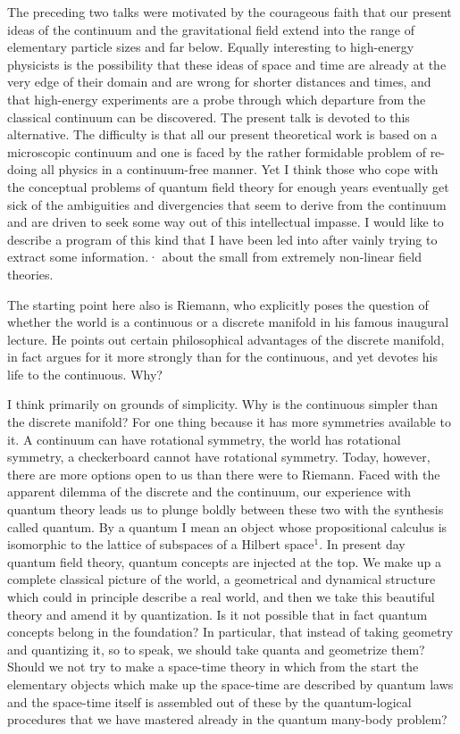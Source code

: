 The preceding two talks were motivated by the courageous faith that our present
ideas of the continuum and the gravitational field extend into the range of
elementary particle sizes and far below. Equally interesting to high-energy
physicists is the possibility that these ideas of space and time are already at
the very edge of their domain and are wrong for shorter distances and times, and
that high-energy experiments are a probe through which departure from the
classical continuum can be discovered. The present talk is devoted to this
alternative. The difficulty is that all our present theoretical work is based on
a microscopic continuum and one is faced by the rather formidable problem of
re-doing all physics in a continuum-free manner. Yet I think those who cope with
the conceptual problems of quantum field theory for enough years eventually get
sick of the ambiguities and divergencies that seem to derive from the continuum
and are driven to seek some way out of this intellectual impasse. I would like to
describe a program of this kind that I have been led into after vainly trying to
extract some information.· about the small from extremely non-linear field
theories.

The starting point here also is Riemann, who explicitly poses the question of
whether the world is a continuous or a discrete manifold in his famous inaugural
lecture. He points out certain philosophical advantages of the discrete manifold,
in fact argues for it more strongly than for the continuous, and yet devotes his
life to the continuous. Why?

I think primarily on grounds of simplicity. Why is the continuous simpler than
the discrete manifold? For one thing because it has more symmetries available to
it. A continuum can have rotational symmetry, the world has rotational symmetry,
a checkerboard cannot have rotational symmetry. Today, however, there are more
options open to us than there were to Riemann. Faced with the apparent dilemma of
the discrete and the continuum, our experience with quantum theory leads us to
plunge boldly between these two with the synthesis called quantum. By a quantum I
mean an object whose propositional calculus is isomorphic to the lattice of
subspaces of a Hilbert space$^1$. In present day quantum field theory, quantum
concepts are injected at the top. We make up a complete classical picture of the
world, a geometrical and dynamical structure which could in principle describe a
real world, and then we take this beautiful theory and amend it by quantization.
Is it not possible that in fact quantum concepts belong in the foundation? In
particular, that instead of taking geometry and quantizing it, so to speak, we
should take quanta and geometrize them? Should we not try to make a space-time
theory in which from the start the elementary objects which make up the
space-time are described by quantum laws and the space-time itself is assembled
out of these by the quantum-logical procedures that we have mastered already in
the quantum many-body problem?

